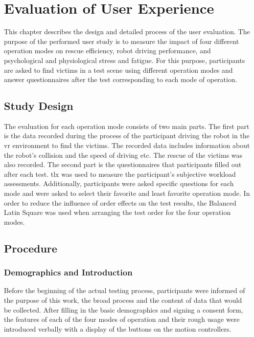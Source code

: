 \chapter{Evaluation of User Experience}
\label{evaluate}

This chapter describes the design and detailed process of the user evaluation. The purpose of the performed user study is to measure the impact of four different operation modes on rescue efficiency, robot driving performance, and psychological and physiological stress and fatigue. For this purpose, participants are asked to find victims in a test scene using different operation modes and answer questionnaires after the test corresponding to each mode of operation.


\section{Study Design}

The evaluation for each operation mode consists of two main parts. The first part is the data recorded during the process of the participant driving the robot in the \gls{vr} environment to find the victims. The recorded data includes information about the robot's collision and the speed of driving etc. The rescue of the victims was also recorded. The second part is the questionnaires that participants filled out after each test. \gls{tlx} was used to measure the participant's subjective workload assessments. Additionally, participants were asked specific questions for each mode and were asked to select their favorite and least favorite operation mode. In order to reduce the influence of order effects on the test results, the Balanced Latin Square was used when arranging the test order for the four operation modes.



\section{Procedure}
\subsection{Demographics and Introduction }
Before the beginning of the actual testing process, participants were informed of the purpose of this work, the broad process and the content of data that would be collected. After filling in the basic demographics and signing a consent form, the features of each of the four modes of operation and their rough usage were introduced verbally with a display of the buttons on the motion controllers.



